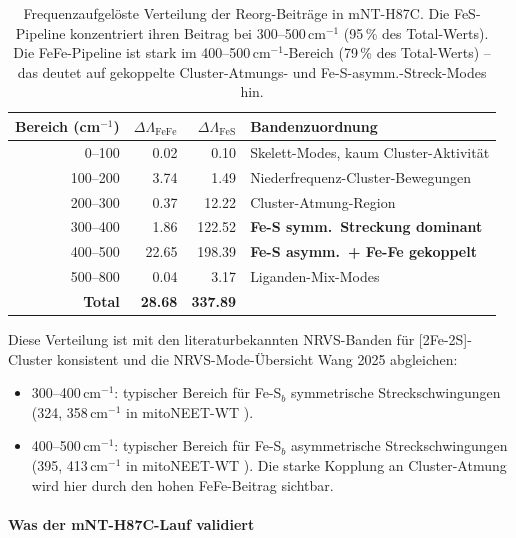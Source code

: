 \documentclass[11pt,a4paper,twoside]{article}
\theoremstyle{remark}
\begin{document}
\begin{table}[h]
\centering
\small
\begin{tabular}{|r|r|r|l|}
\hline
\textbf{Bereich (cm$^{-1}$)} & $\Delta\Lambda_\text{FeFe}$ &
  $\Delta\Lambda_\text{FeS}$ & \textbf{Bandenzuordnung} \\
\hline
0--100   & 0.02   & 0.10    & Skelett-Modes, kaum Cluster-Aktivit\"at \\
100--200 & 3.74   & 1.49    & Niederfrequenz-Cluster-Bewegungen \\
200--300 & 0.37   & 12.22   & Cluster-Atmung-Region \\
300--400 & 1.86   & 122.52  & \textbf{Fe-S symm.\ Streckung dominant} \\
400--500 & 22.65  & 198.39  & \textbf{Fe-S asymm.\ + Fe-Fe gekoppelt} \\
500--800 & 0.04   & 3.17    & Liganden-Mix-Modes \\
\hline
\textbf{Total} & \textbf{28.68} & \textbf{337.89} & \\
\hline
\end{tabular}
\caption{Frequenzaufgel\"oste Verteilung der Reorg-Beitr\"age in
mNT-H87C. Die FeS-Pipeline konzentriert ihren Beitrag bei
300--500\,cm$^{-1}$ (95\,\% des Total-Werts). Die FeFe-Pipeline
ist stark im 400--500\,cm$^{-1}$-Bereich (79\,\% des Total-Werts) --
das deutet auf gekoppelte Cluster-Atmungs- und Fe-S-asymm.-Streck-Modes
hin.}
\label{tab:val-mNT-frequenz}
\end{table}

Diese Verteilung ist mit den literaturbekannten NRVS-Banden f\"ur
[2Fe-2S]-Cluster konsistent
\cite{Gee2021} und die NRVS-Mode-\"Ubersicht Wang 2025 \cite{Wang2025} abgleichen:
\begin{itemize}\setlength{\itemsep}{0pt}
  \item 300--400\,cm$^{-1}$: typischer Bereich f\"ur Fe-S$_b$
        symmetrische Streckschwingungen (324, 358\,cm$^{-1}$ in
        mitoNEET-WT \cite{Gee2021}).
  \item 400--500\,cm$^{-1}$: typischer Bereich f\"ur Fe-S$_b$
        asymmetrische Streckschwingungen (395, 413\,cm$^{-1}$
        in mitoNEET-WT \cite{Gee2021}). Die starke Kopplung an
        Cluster-Atmung wird hier durch den hohen FeFe-Beitrag
        sichtbar.
\end{itemize}

\paragraph{Was der mNT-H87C-Lauf validiert}
\end{document}
